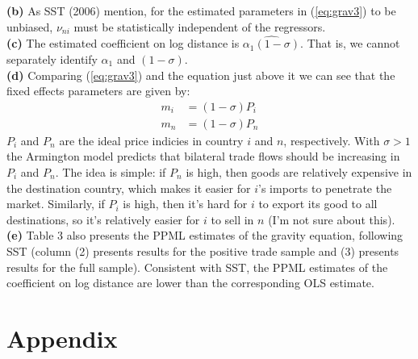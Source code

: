 \documentclass[12pt]{article}
\begin{document}
\textbf{(b)} As SST (2006) mention, for the estimated parameters in (\ref{eq:grav3}) to be unbiased, $\nu_{ni}$ must be statistically independent of the regressors.  \\

\textbf{(c)} The estimated coefficient on log distance is $\widehat{\alpha_1(1-\sigma)}$. That is, we cannot separately identify $\alpha_1$ and $(1-\sigma)$.\\

\textbf{(d)} Comparing (\ref{eq:grav3}) and the equation just above it we can see that the fixed effects parameters are given by:
\begin{align*}
m_i &= (1-\sigma)P_i\\
m_n &= (1-\sigma)P_n
\end{align*}
$P_i$ and $P_n$ are the ideal price indicies in country $i$ and $n$, respectively. With $\sigma>1$ the Armington model predicts that bilateral trade flows should be increasing in $P_i$ and $P_n$. The idea is simple: if $P_n$ is high, then goods are relatively expensive in the destination country, which makes it easier for $i$'s imports to penetrate the market. Similarly, if $P_i$ is high, then it's hard for $i$ to export its good to all destinations, so it's relatively easier for $i$ to sell in $n$ (I'm not sure about this).\\

\textbf{(e)} Table 3 also presents the PPML estimates of the gravity equation, following SST  (column (2) presents results for the positive trade sample and (3) presents results for the full sample). Consistent with SST, the PPML estimates of the coefficient on log distance are lower than the corresponding OLS estimate.

\newpage

\section{Appendix}
\scriptsize
\end{document}
